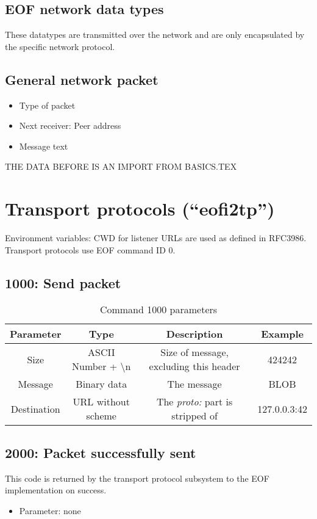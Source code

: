\documentclass[12pt,a4paper]{book}
\begin{document}
\subsection{EOF network data types}
These datatypes are transmitted over the network and are only
encapsulated by the specific network protocol.
\subsection{General network packet}
\begin{itemize}
\item Type of packet
\item Next receiver: Peer address
\item Message text
\end{itemize}

THE DATA BEFORE IS AN IMPORT FROM BASICS.TEX

\section{Transport protocols ("`eofi2tp"')}
Environment variables: CWD for listener
URLs are used as defined in RFC3986\cite{uri-1}.
Transport protocols use EOF command ID 0.
\subsection{1000: Send packet}
\begin{longtable}{|c|c|c|c|}
\caption{Command 1000 parameters}\\
\hline
\textbf{Parameter} & \textbf{Type} & \textbf{Description} & \textbf{Example}\\
\hline
Size & ASCII Number + \textbackslash{}n & Size of message, excluding this header & 424242\\
\hline
Message & Binary data & The message & BLOB\\
\hline
Destination & URL without scheme & The \emph{proto:} part is stripped of & 127.0.0.3:42\\
\hline
\end{longtable}
\subsection{2000: Packet successfully sent}
This code is returned by the transport protocol subsystem to the
EOF implementation on success.
\begin{itemize}
\item Parameter: none
\end{itemize}
\end{document}
